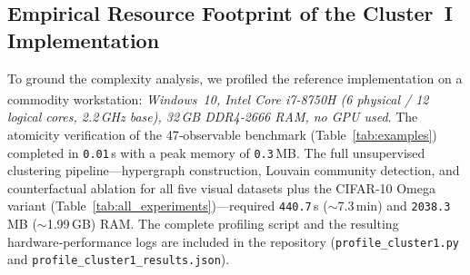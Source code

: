 \subsection{Empirical Resource Footprint of the Cluster~I Implementation}
\label{subsec:empirical_resources}

To ground the complexity analysis, we profiled the reference
implementation on a commodity workstation:
\emph{Windows~10, Intel\textsuperscript{\textregistered} Core\textsuperscript{\texttrademark} i7-8750H
(6 physical / 12 logical cores, 2.2\,GHz base), 32\,GB DDR4‑2666 RAM,
no GPU used}.
%
The atomicity verification of the 47‑observable benchmark
(Table~\ref{tab:examples}) completed in \texttt{0.01}\,s with a peak
memory of \texttt{0.3}\,MB.
%
The full unsupervised clustering pipeline---hypergraph construction,
Louvain community detection, and counterfactual ablation for all five
visual datasets plus the CIFAR‑10 Omega variant
(Table~\ref{tab:all_experiments})---required \texttt{440.7}\,s
($\sim$7.3\,min) and \texttt{2038.3}\,MB ($\sim$1.99\,GB) RAM.
%
The complete profiling script and the resulting hardware‑performance
logs are included in the repository
(\texttt{profile\_cluster1.py} and
\texttt{profile\_cluster1\_results.json}).